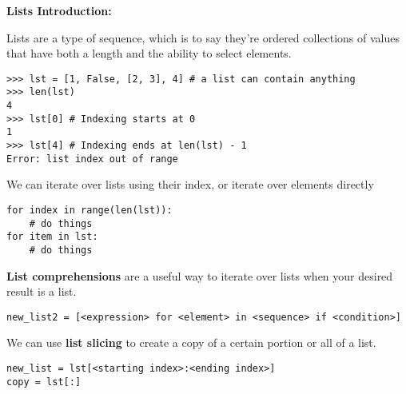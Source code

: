 \textbf{Lists Introduction:}

Lists are a type of sequence, which is to say they're ordered collections of values that have both a length and the ability to select elements.

\begin{lstlisting}
>>> lst = [1, False, [2, 3], 4] # a list can contain anything
>>> len(lst)
4
>>> lst[0] # Indexing starts at 0
1
>>> lst[4] # Indexing ends at len(lst) - 1
Error: list index out of range
\end{lstlisting}

We can iterate over lists using their index, or iterate over elements directly

\begin{lstlisting}
for index in range(len(lst)):
	# do things
for item in lst:
	# do things
\end{lstlisting}

\textbf{List comprehensions} are a useful way to iterate over lists when your desired result is a list.
\begin{lstlisting}
new_list2 = [<expression> for <element> in <sequence> if <condition>]
\end{lstlisting}

We can use \textbf{list slicing} to create a copy of a certain portion or all of a list.

\begin{lstlisting}
new_list = lst[<starting index>:<ending index>]
copy = lst[:]
\end{lstlisting}

